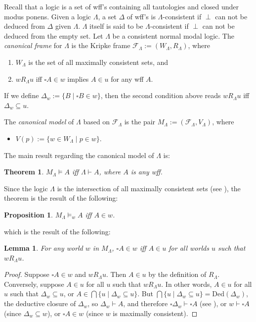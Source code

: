 \documentclass[12pt]{article}
\newtheorem{prop}{Proposition}
\newtheorem{thm}{Theorem}
\newtheorem{lem}{Lemma}
\begin{document}
Recall that a logic is a set of wff's containing all tautologies and closed under modus ponens.  Given a logic $\Lambda$, a set $\Delta$ of wff's is $\Lambda$-consistent if $\perp$ can not be deduced from $\Delta$ given $\Lambda$.  $\Lambda$ itself is said to be $\Lambda$-consistent if $\perp$ can not be deduced from the empty set.  Let $\Lambda$ be a consistent normal modal logic.  The \emph{canonical frame} for $\Lambda$ is the Kripke frame $\mathcal{F}_{\Lambda}:=(W_{\Lambda},R_{\Lambda})$, where
\begin{enumerate}
\item $W_{\Lambda}$ is the set of all maximally consistent sets, and
\item $w R_{\Lambda} u$ iff $\square A \in w$ implies $A \in u$ for any wff $A$.
\end{enumerate}
If we define $\Delta_w:=\lbrace B\mid \square B\in w\rbrace$, then the second condition above reads $w R_{\Lambda} u$ iff $\Delta_w \subseteq u$.  

The \emph{canonical model} of $\Lambda$ based on $\mathcal{F}_{\Lambda}$ is the pair $M_{\Lambda}:=(\mathcal{F}_{\Lambda}, V_{\Lambda})$, where
\begin{itemize}
\item $V(p):=\lbrace w \in W_{\Lambda} \mid p \in w \rbrace$.
\end{itemize}
The main result regarding the canonical model of $\Lambda$ is:
\begin{thm} $M_{\Lambda} \models A$ iff $\Lambda \vdash A$, where $A$ is any wff. \end{thm}
Since the logic $\Lambda$ is the intersection of all maximally consistent sets (see ), the theorem is the result of the following:
\begin{prop} $M_{\Lambda} \models_w A$ iff $A \in w$. \end{prop}
which is the result of the following:
\begin{lem} For any world $w$ in $M_{\Lambda}$, $\square A \in w$ iff $A\in u$ for all worlds $u$ such that $w R_{\Lambda} u$. \end{lem}
\begin{proof}  Suppose $\square A \in w$ and $w R_{\Lambda} u$.  Then $A \in u$ by the definition of $R_{\Lambda}$.  Conversely, suppose $A \in u$ for all $u$ such that $w R_{\Lambda} u$.  In other words, $A\in u$ for all $u$ such that $\Delta_w \subseteq u$, or $A\in \bigcap \lbrace u \mid \Delta_w \subseteq u\rbrace$.  But $\bigcap \lbrace u \mid \Delta_w \subseteq u\rbrace = \mbox{Ded}(\Delta_w)$, the deductive closure of $\Delta_w$, so $\Delta_w \vdash A$, and therefore $\square \Delta_w \vdash \square A$ (see ), or $w \vdash \square A$ (since $\Delta_w \subseteq w$), or $\square A \in w$ (since $w$ is maximally consistent).
\end{proof}
\end{document}
